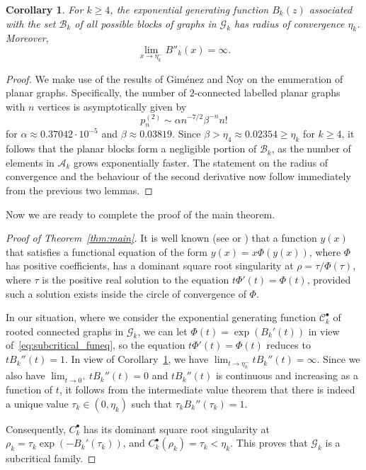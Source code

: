 \documentclass[a4paper]{article}
\newcommand{\G}{\mathcal{G}}
\newcommand{\C}{\mathcal{C}}
\newcommand{\B}{\mathcal{B}}
\newcommand{\A}{\mathcal{A}}
\newtheorem{corollary}[lemma]{Corollary}
\theoremstyle{remark}
\begin{document}
\begin{corollary}\label{cor:Bk}
For $k \geq 4$, the exponential generating function $B_k(z)$ associated with the set $\B_k$ of all possible blocks of graphs in $\G_k$ has radius of convergence $\eta_k$. Moreover,
$$\lim_{x \to \eta_k^-} B''_k(x) = \infty.$$
\end{corollary}

\begin{proof}
We make use of the results of Gim\'enez and Noy \cite{Gimenez2009asymptotic} on the enumeration of planar graphs. Specifically, the number of $2$-connected labelled planar graphs with $n$ vertices is asymptotically given by  \cite[Theorem 9.13]{Drmota2009random}
$$p_n^{(2)} \sim \alpha n^{-7/2} \beta^{-n}n!$$
for $\alpha \approx 0.37042 \cdot 10^{-5}$ and $\beta \approx 0.03819$. Since $\beta > \eta_4 \approx 0.02354 \geq \eta_k$ for $k \geq 4$, it follows that the planar blocks form a negligible portion of $\B_k$, as the number of elements in $\A_k$ grows exponentially faster. The statement on the radius of convergence and the behaviour of the second derivative now follow immediately from the previous two lemmas.
\end{proof}

Now we are ready to complete the proof of the main theorem.

\begin{proof}[Proof of Theorem~\ref{thm:main}]

It is well known (see \cite[Section VI.7]{Flajolet2009analytic} or \cite[Section 3.1.4]{Drmota2009random}) that a function $y(x)$ that satisfies a functional equation of the form $y(x) = x \Phi(y(x))$, where $\Phi$ has positive coefficients, has a dominant square root singularity at $\rho = \tau/\Phi(\tau)$, where $\tau$ is the positive real solution to the equation $t\Phi'(t) = \Phi(t)$, provided such a solution exists inside the circle of convergence of $\Phi$.

In our situation, where we consider the exponential generating function $\C_k^{\bullet}$ of rooted connected graphs in $\G_k$, we can let $\Phi(t) = \exp(B_k'(t))$ in view of~\eqref{eq:subcritical_funeq}, so the equation $t \Phi'(t) = \Phi(t)$ reduces to $t B_k''(t) = 1$. In view of Corollary~\ref{cor:Bk}, we have $\lim_{t \to \eta_k^-} t B_k''(t) = \infty$. Since we also have $\lim_{t \to 0^+} t B_k''(t) = 0$ and $t B_k''(t)$ is continuous and increasing as a function of $t$, it follows from the intermediate value theorem that there is indeed a unique value $\tau_k \in (0, \eta_k)$ such that $\tau_k B_k''(\tau_k) = 1$. 

Consequently, $C^{\bullet}_k$  has its dominant square root singularity at $\rho_k = \tau_k \exp(-B_k'(\tau_k))$, and $C^{\bullet}_k(\rho_k) = \tau_k < \eta_k$. This proves that $\G_k$ is a subcritical family.
\end{proof}
\end{document}
